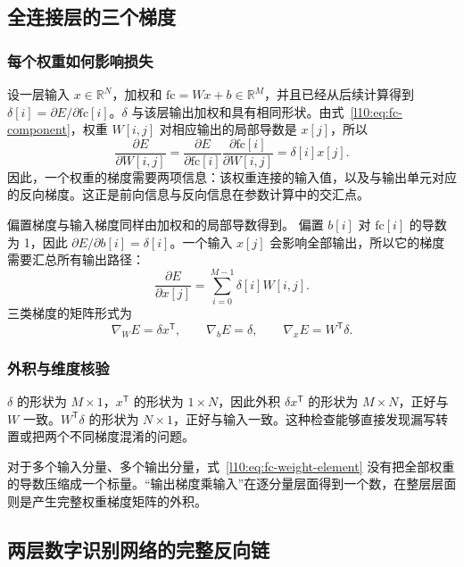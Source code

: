 \subsection{全连接层的三个梯度}

\subsubsection{每个权重如何影响损失}
设一层输入 $x\in\mathbb{R}^N$，加权和 $\mathrm{fc}=Wx+b\in\mathbb{R}^M$，并且已经从后续计算得到
$\delta[i]=\partial E/\partial\mathrm{fc}[i]$。$\delta$ 与该层输出加权和具有相同形状。由式~\eqref{l10:eq:fc-component}，权重 $W[i,j]$ 对相应输出的局部导数是 $x[j]$，所以
\begin{equation}
 \frac{\partial E}{\partial W[i,j]}
 =\frac{\partial E}{\partial\mathrm{fc}[i]}
   \frac{\partial\mathrm{fc}[i]}{\partial W[i,j]}
 =\delta[i]x[j].
 \label{l10:eq:fc-weight-element}
\end{equation}
因此，一个权重的梯度需要两项信息：该权重连接的输入值，以及与输出单元对应的反向梯度。这正是前向信息与反向信息在参数计算中的交汇点。

偏置梯度与输入梯度同样由加权和的局部导数得到。
偏置 $b[i]$ 对 $\mathrm{fc}[i]$ 的导数为 1，因此 $\partial E/\partial b[i]=\delta[i]$。一个输入 $x[j]$ 会影响全部输出，所以它的梯度需要汇总所有输出路径：
\begin{equation}
 \frac{\partial E}{\partial x[j]}=\sum_{i=0}^{M-1}\delta[i]W[i,j].
\end{equation}
三类梯度的矩阵形式为
\begin{equation}
 \boxed{\nabla_WE=\delta x^{\mathsf T},\qquad
 \nabla_bE=\delta,\qquad
 \nabla_xE=W^{\mathsf T}\delta.}
 \label{l10:eq:fc-gradients}
\end{equation}

\subsubsection{外积与维度核验}
$\delta$ 的形状为 $M\times1$，$x^{\mathsf T}$ 的形状为 $1\times N$，因此外积 $\delta x^{\mathsf T}$ 的形状为 $M\times N$，正好与 $W$ 一致。$W^{\mathsf T}\delta$ 的形状为 $N\times1$，正好与输入一致。这种检查能够直接发现漏写转置或把两个不同梯度混淆的问题。

对于多个输入分量、多个输出分量，式~\eqref{l10:eq:fc-weight-element} 没有把全部权重的导数压缩成一个标量。“输出梯度乘输入”在逐分量层面得到一个数，在整层层面则是产生完整权重梯度矩阵的外积。

\subsection{两层数字识别网络的完整反向链}

